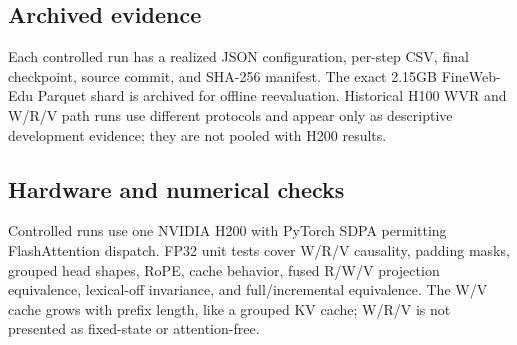 \subsection{Archived evidence}

Each controlled run has a realized JSON configuration, per-step CSV, final checkpoint, source commit, and SHA-256 manifest. The exact 2.15GB FineWeb-Edu Parquet shard is archived for offline reevaluation. Historical H100 WVR and W/R/V path runs use different protocols and appear only as descriptive development evidence; they are not pooled with H200 results.

\subsection{Hardware and numerical checks}

Controlled runs use one NVIDIA H200 with PyTorch SDPA permitting FlashAttention dispatch. FP32 unit tests cover W/R/V causality, padding masks, grouped head shapes, RoPE, cache behavior, fused R/W/V projection equivalence, lexical-off invariance, and full/incremental equivalence. The W/V cache grows with prefix length, like a grouped KV cache; W/R/V is not presented as fixed-state or attention-free.